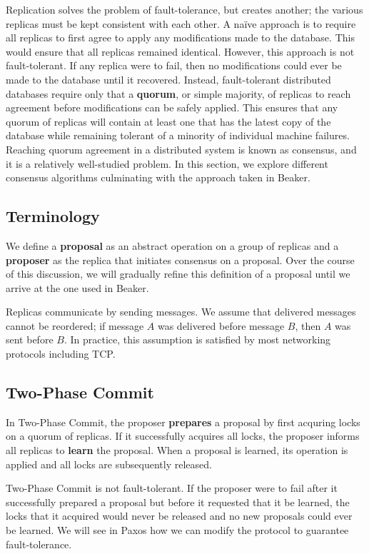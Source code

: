 \documentclass{article}
\begin{document}
  Replication solves the problem of fault-tolerance, but creates another; the various replicas must be
  kept consistent with each other. A na\"ive approach is to require all replicas to first agree to
  apply any modifications made to the database. This would ensure that all replicas remained
  identical. However, this approach is not fault-tolerant. If any replica were to fail, then no
  modifications could ever be made to the database until it recovered. Instead, fault-tolerant
  distributed databases require only that a \textbf{quorum}, or simple majority, of replicas to reach
  agreement before modifications can be safely applied. This ensures that any quorum of replicas will
  contain at least one that has the latest copy of the database while remaining tolerant of a minority
  of individual machine failures. Reaching quorum agreement in a distributed system is known as
  consensus, and it is a relatively well-studied problem. In this section, we explore different
  consensus algorithms culminating with the approach taken in Beaker.

    \subsection{Terminology}
    We define a \textbf{proposal} as an abstract operation on a group of replicas and a
    \textbf{proposer} as the replica that initiates consensus on a proposal. Over the course of this
    discussion, we will gradually refine this definition of a proposal until we arrive at the one used
    in Beaker.

    Replicas communicate by sending messages. We assume that delivered messages cannot be reordered;
    if message $A$ was delivered before message $B$, then $A$ was sent before $B$. In practice, this
    assumption is satisfied by most networking protocols including TCP.

    \subsection{Two-Phase Commit}
    In Two-Phase Commit, the proposer \textbf{prepares} a proposal by first acquring locks on a quorum
    of replicas. If it successfully acquires all locks, the proposer informs all replicas to
    \textbf{learn} the proposal. When a proposal is learned, its operation is applied and all locks are
    subsequently released.

    Two-Phase Commit is not fault-tolerant. If the proposer were to fail after it successfully
    prepared a proposal but before it requested that it be learned, the locks that it acquired would
    never be released and no new proposals could ever be learned. We will see in Paxos how we can
    modify the protocol to guarantee fault-tolerance.
\end{document}
